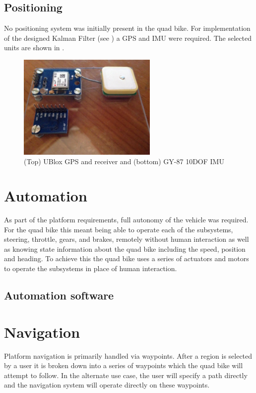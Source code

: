 \documentclass[main.tex]{subfiles}
\begin{document}
\subsection{Positioning}
No positioning system was initially present in the quad bike. For implementation of the designed Kalman Filter (see ) a GPS and IMU were required. The selected units are shown in .

\begin{figure}[ht]
\includegraphics[width=0.6\textwidth]{4-DetailedDesign/Positioning.jpg}
\centering
\caption{(Top) UBlox GPS and receiver and (bottom) GY-87 10DOF IMU} 
\end{figure}

\section{Automation}

As part of the platform requirements, full autonomy of the vehicle was required. For the quad bike this meant being able to operate each of the subsystems, steering, throttle, gears, and brakes, remotely without human interaction as well as knowing state information about the quad bike including the speed, position and heading. To achieve this the quad bike uses a series of actuators and motors to operate the subsystems in place of human interaction.

\subsection{Automation software}

\section{Navigation}
Platform navigation is primarily handled via waypoints. After a region is selected by a user it is broken down into a series of waypoints which the quad bike will attempt to follow. In the alternate use case, the user will specify a path directly and the navigation system will operate directly on these waypoints.
\end{document}
